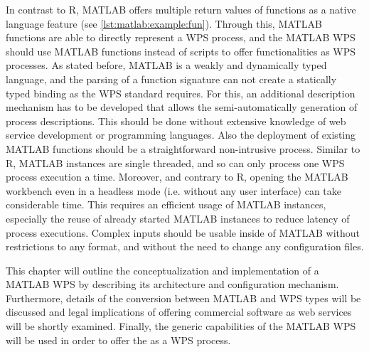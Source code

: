   In contrast to R, MATLAB offers multiple return values of functions as a native language feature (see \cref{lst:matlab:example:fun}). Through this, MATLAB functions are able to directly represent a \ac{WPS} process, and the MATLAB WPS should use MATLAB functions instead of scripts to offer functionalities as WPS processes. As stated before, MATLAB is a weakly and dynamically typed language, and the parsing of a function signature can not create a statically typed binding as the \ac{WPS} standard requires. For this, an additional description mechanism has to be developed that allows the semi-automatically generation of process descriptions. This should be done without extensive knowledge of web service development or programming languages. Also the deployment of existing MATLAB functions should be a straightforward non-intrusive process. Similar to R, MATLAB instances are single threaded, and so can only process one WPS process execution a time. Moreover, and contrary to R, opening the MATLAB workbench even in a headless mode (i.e. without any user interface) can take considerable time. This requires an efficient usage of MATLAB instances, especially the reuse of already started MATLAB instances to reduce latency of process executions. Complex inputs should be usable inside of MATLAB without restrictions to any format, and without the need to change any configuration files.

  

  This chapter will outline the conceptualization and implementation of a MATLAB WPS by describing its architecture and configuration mechanism. Furthermore, details of the conversion between MATLAB and WPS types will be discussed and legal implications of offering commercial software as web services will be shortly examined. Finally, the generic capabilities of the MATLAB WPS will be used in order to offer the \la as a WPS process.

